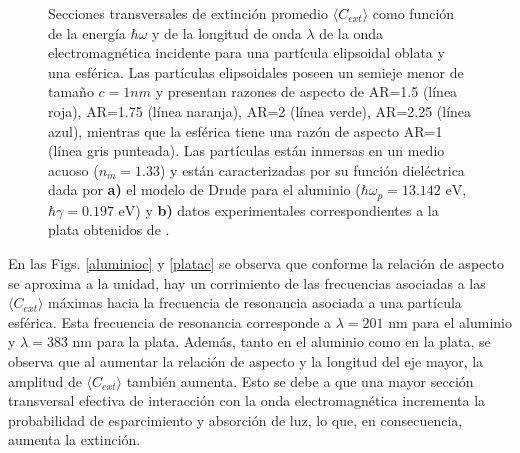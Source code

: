 \begin{figure}[h!]
	\quad%
	\caption{Secciones transversales de extinción promedio $\langle C_{ext}\rangle$ como función de la energía $\hbar\omega$ y de la longitud de onda $\lambda$ de la onda electromagnética incidente para una partícula elipsoidal oblata y una esférica. Las partículas elipsoidales poseen un semieje menor de tamaño $c=1nm$ y presentan razones de aspecto de AR=1.5 (línea roja), AR=1.75 (línea naranja), AR=2 (línea verde), AR=2.25 (línea azul), mientras que la esférica tiene una razón de aspecto AR=1 (línea gris punteada). Las partículas están inmersas en un medio acuoso ($n_m=1.33$) y están caracterizadas por su función dieléctrica dada por  \textbf{a)} el modelo de Drude para el aluminio ($\hbar\omega_p=13.142\text{ eV}$, $\hbar\gamma=0.197\text{ eV}$) y \textbf{b)} datos experimentales correspondientes a la plata obtenidos de \cite{Plata}.}\label{aluminioplatac}
\end{figure} 

 En las Figs. \ref{aluminioc}  y \ref{platac} se observa que conforme la relación de aspecto se aproxima a la unidad, hay un corrimiento de las frecuencias asociadas a las $\langle C_{ext}\rangle$ máximas hacia la frecuencia de resonancia asociada a una partícula esférica. Esta frecuencia de resonancia corresponde a $\lambda=201\text{ nm}$ para el aluminio y $\lambda=383\text{ nm}$ para la plata. Además, tanto en el aluminio como en la plata, se observa que al aumentar la relación de aspecto y la longitud del eje mayor, la amplitud de  $\langle C_{ext}\rangle$ también aumenta. Esto se debe a que una mayor sección transversal efectiva de interacción con la onda electromagnética incrementa la probabilidad de esparcimiento y absorción de luz, lo que, en consecuencia, aumenta la extinción.



